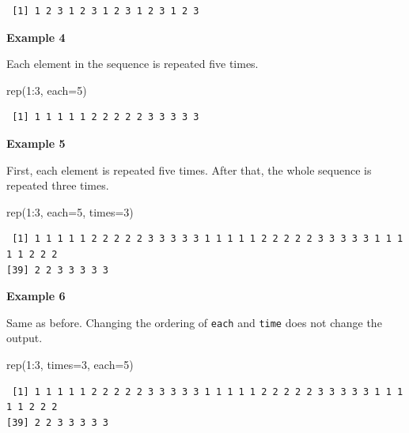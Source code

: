 \documentclass[
  letterpaper,
  DIV=11,
  numbers=noendperiod]{scrreprt}
\newenvironment{Shaded}{\begin{snugshade}}{\end{snugshade}}
\newcommand{\AttributeTok}[1]{\textcolor[rgb]{0.40,0.45,0.13}{#1}}
\newcommand{\DecValTok}[1]{\textcolor[rgb]{0.68,0.00,0.00}{#1}}
\newcommand{\FunctionTok}[1]{\textcolor[rgb]{0.28,0.35,0.67}{#1}}
\newcommand{\NormalTok}[1]{\textcolor[rgb]{0.00,0.23,0.31}{#1}}
\newcommand{\SpecialCharTok}[1]{\textcolor[rgb]{0.37,0.37,0.37}{#1}}
\begin{document}
\begin{verbatim}
 [1] 1 2 3 1 2 3 1 2 3 1 2 3 1 2 3
\end{verbatim}

\textbf{Example 4}

Each element in the sequence is repeated five times.

\begin{Shaded}
\begin{Highlighting}[]
\FunctionTok{rep}\NormalTok{(}\DecValTok{1}\SpecialCharTok{:}\DecValTok{3}\NormalTok{, }\AttributeTok{each=}\DecValTok{5}\NormalTok{)}
\end{Highlighting}
\end{Shaded}

\begin{verbatim}
 [1] 1 1 1 1 1 2 2 2 2 2 3 3 3 3 3
\end{verbatim}

\textbf{Example 5}

First, each element is repeated five times. After that, the whole
sequence is repeated three times.

\begin{Shaded}
\begin{Highlighting}[]
\FunctionTok{rep}\NormalTok{(}\DecValTok{1}\SpecialCharTok{:}\DecValTok{3}\NormalTok{, }\AttributeTok{each=}\DecValTok{5}\NormalTok{, }\AttributeTok{times=}\DecValTok{3}\NormalTok{)}
\end{Highlighting}
\end{Shaded}

\begin{verbatim}
 [1] 1 1 1 1 1 2 2 2 2 2 3 3 3 3 3 1 1 1 1 1 2 2 2 2 2 3 3 3 3 3 1 1 1 1 1 2 2 2
[39] 2 2 3 3 3 3 3
\end{verbatim}

\textbf{Example 6}

Same as before. Changing the ordering of \texttt{each} and \texttt{time}
does not change the output.

\begin{Shaded}
\begin{Highlighting}[]
\FunctionTok{rep}\NormalTok{(}\DecValTok{1}\SpecialCharTok{:}\DecValTok{3}\NormalTok{, }\AttributeTok{times=}\DecValTok{3}\NormalTok{, }\AttributeTok{each=}\DecValTok{5}\NormalTok{)}
\end{Highlighting}
\end{Shaded}

\begin{verbatim}
 [1] 1 1 1 1 1 2 2 2 2 2 3 3 3 3 3 1 1 1 1 1 2 2 2 2 2 3 3 3 3 3 1 1 1 1 1 2 2 2
[39] 2 2 3 3 3 3 3
\end{verbatim}
\end{document}
